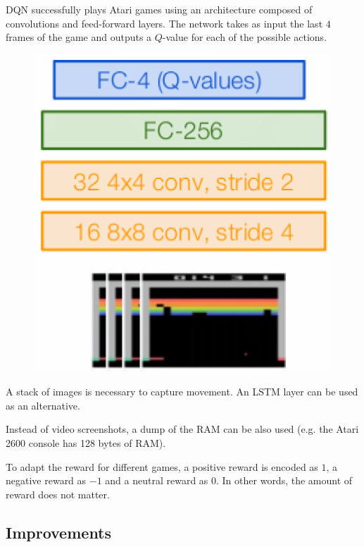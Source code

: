 \begin{example}
    DQN successfully plays Atari games using an architecture composed of convolutions and feed-forward layers.
    The network takes as input the last $4$ frames of the game and outputs a $Q$-value for each of the possible actions. 

    \begin{figure}[H]
        \centering
        \includegraphics[width=0.2\linewidth]{./img/dqn_atari.png}
    \end{figure}

    A stack of images is necessary to capture movement. An LSTM layer can be used as an alternative.

    Instead of video screenshots, a dump of the RAM can be also used (e.g. the Atari 2600 console has 128 bytes of RAM).

    To adapt the reward for different games, a positive reward is encoded as $1$, a negative reward as $-1$ and a neutral reward as $0$. In other words, the amount of reward does not matter.
\end{example}


\subsection{Improvements} \label{sec:dqn_improvements}

